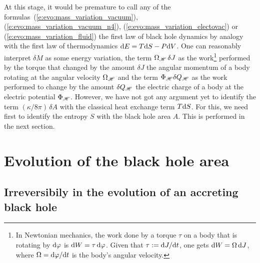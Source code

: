 At this stage, it would be premature to call any of the formulas~(\ref{e:evo:mass_variation_vacuum}),
(\ref{e:evo:mass_variation_vacuum_n4}), (\ref{e:evo:mass_variation_electovac})
or (\ref{e:evo:mass_variation_fluid})
the first law of black hole dynamics by analogy with the first law of thermodynamics
$\mathrm{d} E = T \mathrm{d} S - P \mathrm{d} V$. One can reasonably interpret $\delta M$
as some energy variation, the term
$\Omega_{\mathscr{H}} \, \delta J$ as the work\footnote{In Newtonian mechanics, the
work done by a torque $\tau$ on a body that is rotating by $\mathrm{d}\varphi$
is $\mathrm{d} W = \tau \, \mathrm{d}\varphi$. Given that $\tau := \mathrm{d} J/\mathrm{d} t$, one gets $\mathrm{d} W = \Omega \, \mathrm{d} J$, where
$\Omega = \mathrm{d}\varphi/\mathrm{d} t$ is the body's angular velocity.} performed by the torque
that changed by the amount $\delta J$ the angular momentum of a body rotating
at the angular velocity $\Omega_{\mathscr{H}}$ and the term $\Phi_{\mathscr{H}} \delta Q_{\mathscr{H}}$
as the work performed to change by the amount $\delta Q_{\mathscr{H}}$ the electric charge
of a body at the electric potential $\Phi_{\mathscr{H}}$.
However, we have not got any argument yet
to identify the term $(\kappa/8\pi) \, \delta A$ with the classical heat exchange term $T\mathrm{d} S$.
For this, we need first to identify the entropy $S$ with the black hole area $A$.
This is performed in the next section.



\section{Evolution of the black hole area} \label{s:evo:evol_area}

\subsection{Irreversibily in the evolution of an accreting black hole} \label{s:evo:irreversible_mass}

